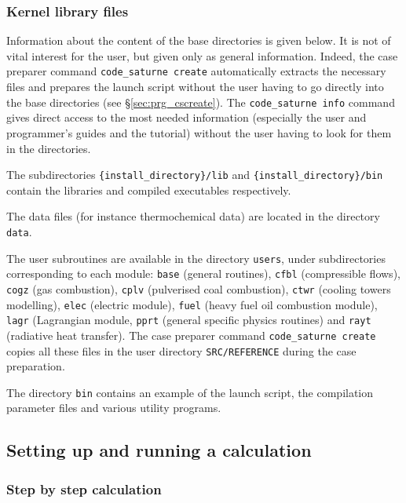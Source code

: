 {{{\subsubsection{\CS Kernel library files}
\label{sec:prg_library}%
Information about the content of the \CS base directories is given below. It
is not of vital interest for the user, but given only as general
information. Indeed, the case preparer command \texttt{code\_saturne~create}
automatically extracts the necessary files and prepares the launch script
without the user having to go directly into the \CS base directories
(see \S\ref{sec:prg_cscreate}).
The \texttt{code\_saturne~info} command gives direct
access to the most needed information (especially the user and programmer's
guides and the tutorial) without the user having to look for them in the \CS
directories.

The subdirectories \texttt{\{install\_directory\}/lib} and \texttt{\{install\_directory\}/bin }
contain the libraries and compiled executables respectively.

The data files (for instance thermochemical data) are located in the
directory \texttt{data}.

The user subroutines are available in the directory \texttt{users},
under subdirectories corresponding to each module:
\texttt{base} (general routines),
\texttt{cfbl} (compressible flows),
\texttt{cogz} (gas combustion),
\texttt{cplv} (pulverised coal combustion),
\texttt{ctwr} (cooling towers modelling),
\texttt{elec} (electric module),
\texttt{fuel} (heavy fuel oil combustion module),
\texttt{lagr} (Lagrangian module,
\texttt{pprt} (general specific physics routines) and
\texttt{rayt} (radiative heat transfer).
The case preparer command \texttt{code\_saturne~create} copies all these files
in the user directory \texttt{SRC/REFERENCE} during the case preparation.

The directory \texttt{bin} contains an example of the launch script, the
compilation parameter files and various utility programs.

\subsection{Setting up and running a calculation}

\subsubsection{Step by step calculation}
\label{sec:prg_stepbystepcalculation}%

}}}
